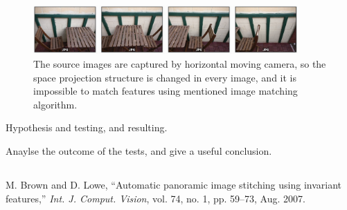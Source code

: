 \documentclass[10pt,twocolumn,letterpaper]{article}
\begin{document}
\begin{figure}
    \begin{center}
        \includegraphics[width=0.9\textwidth]{horizontal_motion}
    \end{center}
    \caption{The source images are captured by horizontal moving camera, so the space projection structure is changed in every image,
    and it is impossible to match features using mentioned image matching algorithm.}
    \label{fig:cameramotion}
\end{figure}


Hypothesis and testing, and resulting.

Anaylse the outcome of the tests, and give a useful conclusion.

\subsection{}


\begin{thebibliography}{9}
M. Brown and D. Lowe, ``Automatic panoramic image stitching using invariant features,''
\textit{Int. J. Comput. Vision}, vol. 74, no. 1, pp. 59–73, Aug. 2007.

\end{thebibliography}
\end{document}

